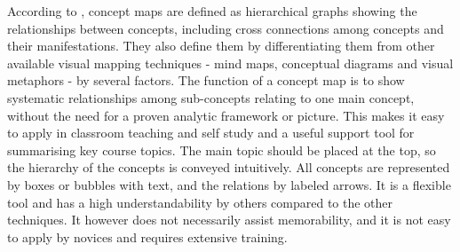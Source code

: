 
According to , concept maps are defined as hierarchical graphs showing the relationships between concepts, including cross connections among concepts and their manifestations. They also define them by differentiating them from other available visual mapping techniques - mind maps, conceptual diagrams and visual metaphors - by several factors. The function of a concept map is to show systematic relationships among sub-concepts relating to one main concept, without the need for a proven analytic framework or picture. This makes it easy to apply in classroom teaching and self study and a useful support tool for summarising key course topics. The main topic should be placed at the top, so the hierarchy of the concepts is conveyed intuitively. All concepts are represented by boxes or bubbles with text, and the relations by labeled arrows. It is a flexible tool and has a high understandability by others compared to the other techniques. It however does not necessarily assist memorability, and it is not easy to apply by novices and requires extensive training.

